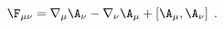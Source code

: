 \begin{equation}
  \label{eq:Fcur}
  \F_{\mu\nu} = \nabla_\mu\A_\nu - \nabla_\nu\A_\mu + \left[\A_\mu,\A_\nu\right] \; .
\end{equation}

